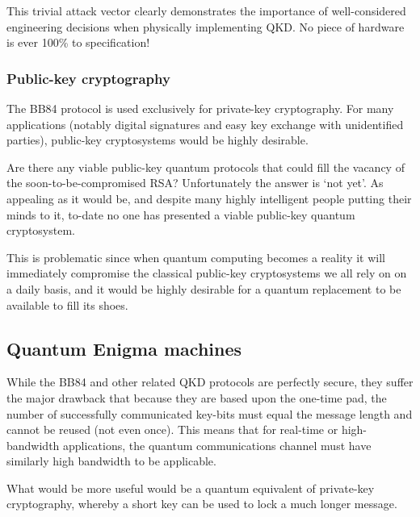 This trivial attack vector clearly demonstrates the importance of well-considered engineering decisions when physically implementing QKD. No piece of hardware is ever 100\% to specification!

\subsubsection{Public-key cryptography}

The BB84 protocol is used exclusively for private-key cryptography. For many applications (notably digital signatures and easy key exchange with unidentified parties), public-key cryptosystems would be highly desirable.

Are there any viable public-key quantum protocols that could fill the vacancy of the soon-to-be-compromised RSA? Unfortunately the answer is `not yet'. As appealing as it would be, and despite many highly intelligent people putting their minds to it, to-date no one has presented a viable public-key quantum cryptosystem.

This is problematic since when quantum computing becomes a reality it will immediately compromise the classical public-key cryptosystems we all rely on on a daily basis, and it would be highly desirable for a quantum replacement to be available to fill its shoes.

%
%

\subsection{Quantum Enigma machines}

While the BB84 and other related QKD protocols are perfectly secure, they suffer the major drawback that because they are based upon the one-time pad, the number of successfully communicated key-bits must equal the message length and cannot be reused (not even once). This means that for real-time or high-bandwidth applications, the quantum communications channel must have similarly high bandwidth to be applicable.

What would be more useful would be a quantum equivalent of private-key cryptography, whereby a short key can be
used to lock a much longer message.

